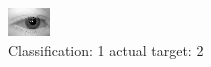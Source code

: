 \begin{figure}[h!]
\begin{center}
\includegraphics[width=0.60\columnwidth]{figures/ID411_class_1_target_2.png}
\end{center}
\caption{ Classification: 1 actual target: 2}
\label{fig:ID411_class_1_target_2}
\end{figure}
